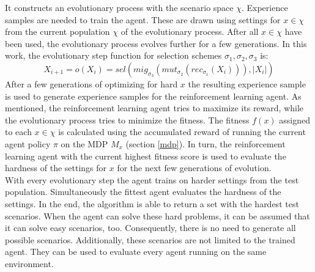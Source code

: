 It constructs an evolutionary process with the scenario space $\chi$. Experience samples are needed to train the agent. These are drawn using settings for $x \in \chi$ from the current population $\chi$ of the evolutionary process. After all $x \in \chi$ have been used, the evolutionary process evolves further for a few generations. In this work, the evolutionary step function for selection schemes $\sigma_1, \sigma_2, \sigma_3$ is:
\begin{equation}
X_{i+1} = o(X_i) = sel(mig_{\sigma_3}(mut_{\sigma_2}(rec_{\sigma_1}(X_i))),|X_i|)
\end{equation}
After a few generations of optimizing for hard $x$ the resulting experience sample is used to generate experience samples for the reinforcement learning agent. As mentioned, the reinforcement learning agent tries to maximize its reward, while the evolutionary process tries to minimize the fitness. The fitness $f(x)$ assigned to each $x \in \chi$ is calculated using the accumulated reward of running the current agent policy $\pi$ on the MDP $M_x$ (section \ref{mdp}). In turn, the reinforcement learning agent with the current highest fitness score is used to evaluate the hardness of the settings for $x$ for the next few generations of evolution.\\
With every evolutionary step the agent trains on harder settings from the test population. Simultaneously the fittest agent evaluates the hardness of the settings. In the end, the algorithm is able to return a set with the hardest test scenarios. When the agent can solve these hard problems, it can be assumed that it can solve easy scenarios, too. Consequently, there is no need to generate all possible scenarios. Additionally, these scenarios are not limited to the trained agent. They can be used to evaluate every agent running on the same environment.